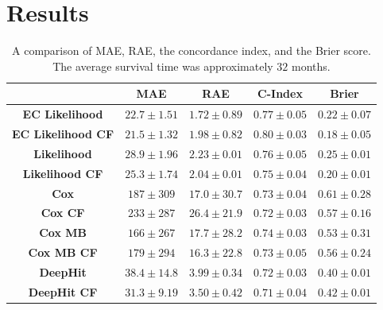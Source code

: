     \section{Results} \label{sec:deep_learning_for_ct_based_survival_analysis_of_idiopathic_pulmonary_fibrosis_patients_appendix_results}
        \begin{table}
            \centering
            
            \captionsetup{singlelinecheck=false}
            \caption{
                A comparison of \gls{MAE}, \gls{RAE}, the concordance index, and the Brier score. The average survival time was approximately $32$ months.
            }
            
            \resizebox*{1.0\linewidth}{!}
            {
                \begin{tabular}{||c|cc|c|c||}
                    \hline
                                                            & \textbf{\gls{MAE}} & \textbf{\gls{RAE}} & \textbf{C-Index}  & \textbf{Brier}    \\
                    \hline
                    \textbf{\gls{EC} Likelihood}            & $22.7\pm1.51$      & $1.72\pm0.89$      & $0.77\pm0.05$     & $0.22\pm0.07$      \\
                    \textbf{\gls{EC} Likelihood \gls{CF}}   & $21.5\pm1.32$      & $1.98\pm0.82$      & $0.80\pm0.03$     & $0.18\pm0.05$      \\
                    \textbf{Likelihood}                    & $28.9\pm1.96$      & $2.23\pm0.01$      & $0.76\pm0.05$     & $0.25\pm0.01$      \\
                    \textbf{Likelihood \gls{CF}}           & $25.3\pm1.74$      & $2.04\pm0.01$      & $0.75\pm0.04$     & $0.20\pm0.01$      \\
                    \hline
                    \textbf{Cox}                           & $187 \pm309 $      & $17.0\pm30.7$      & $0.73\pm0.04$     & $0.61\pm0.28$      \\
                    \textbf{Cox \gls{CF}}                  & $233 \pm287 $      & $26.4\pm21.9$      & $0.72\pm0.03$     & $0.57\pm0.16$      \\
                    \textbf{Cox \gls{MB}}                  & $166 \pm267 $      & $17.7\pm28.2$      & $0.74\pm0.03$     & $0.53\pm0.31$      \\
                    \textbf{Cox \gls{MB} \gls{CF}}         & $179 \pm294 $      & $16.3\pm22.8$      & $0.73\pm0.05$     & $0.56\pm0.24$      \\
                    \hline
                    \textbf{DeepHit}                       & $38.4\pm14.8$      & $3.99\pm0.34$      & $0.72\pm0.03$     & $0.40\pm0.01$      \\
                    \textbf{DeepHit \gls{CF}}              & $31.3\pm9.19$      & $3.50\pm0.42$      & $0.71\pm0.04$     & $0.42\pm0.01$      \\
                    \hline
                \end{tabular}
            }
            \label{tab:deep_learning_for_ct_based_survival_analysis_of_idiopathic_pulmonary_fibrosis_patients_appendix_results_table}
        \end{table}
    
